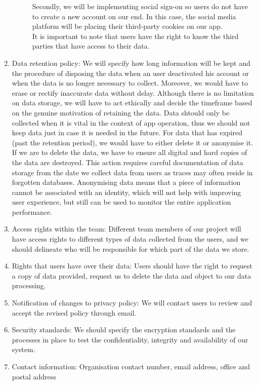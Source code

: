 \begin{enumerate}
\begin{description}
        Secondly, we will be implementing social sign-on so users do not have to create a new account on our end. In this case, the social media 
        platform will be placing their third-party cookies on our app.
        \\It is important to note that users have the right to know the third parties that have access to their data.
    \end{description}
    \item Data retention policy: We will specify how long information will be kept and the procedure of disposing the data when an user deactivated
    his account or when the data is no longer necessary to collect. Moreover, we would have to erase or rectify inaccurate data without delay. Although 
    there is no limitation on data storage, we will have to act ethically and
    decide the timeframe based on the genuine motivation of retaining the data. Data shtould only be collected when it is vital in the context
    of app operation, thus we should not keep data just in case it is needed in the future. For data that has expired (past the retention period), we 
    would have to either delete it or anonymise it. If we are to delete the data, we have to ensure all digital and hard copies of the data are destroyed. 
    This action requires careful documentation of data storage from the date we collect data from users as traces may often reside in forgotten databases.
    Anonymising data means that a piece of information cannot be associated with an identity, which will not help with improving user experience, but still 
    can be used to monitor the entire application performance.
    \item Access rights within the team: Different team members of our project will have access rights to different types of data collected from
    the users, and we should delineate who will be responsible for which part of the data we store.
    \item Rights that users have over their data: Users should have the right to request a copy of data provided, request us to delete the data and object to our data processing.
    \item Notification of changes to privacy policy: We will contact users to review and accept the revised policy through email.
    \item Security standards: We should specify the encryption standards and the processes in place to test the confidentiality, integrity and availability of 
    our system.
    \item Contact information: Organisation contact number, email address, office and postal address
\end{enumerate}

